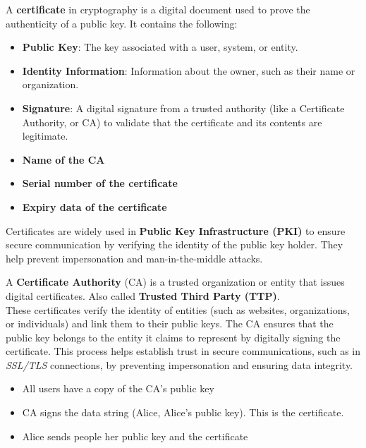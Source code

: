 \begin{defn}
    A \textbf{certificate} in cryptography is a digital document used to prove the authenticity of a public key. It contains the following:

    \begin{itemize}
        \item \textbf{Public Key}: The key associated with a user, system, or entity.
        \item \textbf{Identity Information}: Information about the owner, such as their name or organization.
        \item \textbf{Signature}: A digital signature from a trusted authority (like a Certificate Authority, or CA) to validate that the certificate and its contents are legitimate.
        \item \textbf{Name of the CA}
        \item \textbf{Serial number of the certificate}
        \item \textbf{Expiry data of the certificate}

    \end{itemize}
    
    Certificates are widely used in \textbf{Public Key Infrastructure (PKI)} to ensure secure communication by verifying the identity of the public key holder. They help prevent impersonation and man-in-the-middle attacks.     
\end{defn}

\begin{defn}
    A \textbf{Certificate Authority} (CA) is a trusted organization or entity that issues digital certificates. 
    Also called \textbf{Trusted Third Party (TTP)}. \\

    These certificates verify the identity of entities (such as websites, organizations, or individuals) and link them to their public keys. 
    The CA ensures that the public key belongs to the entity it claims to represent by digitally signing the certificate. 
    This process helps establish trust in secure communications, such as in \emph{SSL/TLS} connections, by preventing impersonation and ensuring data integrity.

    \begin{itemize}
        \item All users have a copy of the CA's public key
        \item CA signs the data string (Alice, Alice's public key). This is the certificate.
        \item Alice sends people her public key and the certificate
    \end{itemize}
\end{defn}

